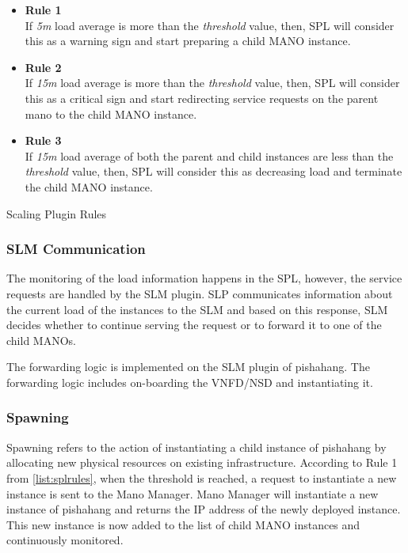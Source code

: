 \begin{enumeratelist}

\begin{itemize}
	\item{\textbf{Rule 1}\\} If \textit{5m} load average is more than the \textit{threshold} value, then, SPL will consider this as a warning sign and start preparing a child MANO instance.
	\item{\textbf{Rule 2}\\} If \textit{15m} load average is more than the \textit{threshold} value, then, SPL will consider this as a critical sign and start redirecting service requests on the parent mano to the child MANO instance.
	\item{\textbf{Rule 3}\\} If \textit{15m} load average of both the parent and child instances are less than the \textit{threshold} value, then, SPL will consider this as decreasing load and terminate the child MANO instance.

\end{itemize}
\caption{Scaling Plugin Rules}
\label{list:splrules}
\end{enumeratelist}


\subsubsection*{SLM Communication}

The monitoring of the load information happens in the SPL, however, the service requests are handled by the SLM plugin. SLP communicates information about the current load of the instances to the SLM and based on this response, SLM decides whether to continue serving the request or to forward it to one of the child MANOs.

The forwarding logic is implemented on the SLM plugin of pishahang. The forwarding logic includes on-boarding the VNFD/NSD and instantiating it.

\subsubsection*{Spawning}

Spawning refers to the action of instantiating a child instance of pishahang by allocating new physical resources on existing infrastructure. According to Rule 1 from \ref{list:splrules}, when the threshold is reached, a request to instantiate a new instance is sent to the Mano Manager. Mano Manager will instantiate a new instance of pishahang and returns the IP address of the newly deployed instance. This new instance is now added to the list of child MANO instances and continuously monitored.
 

